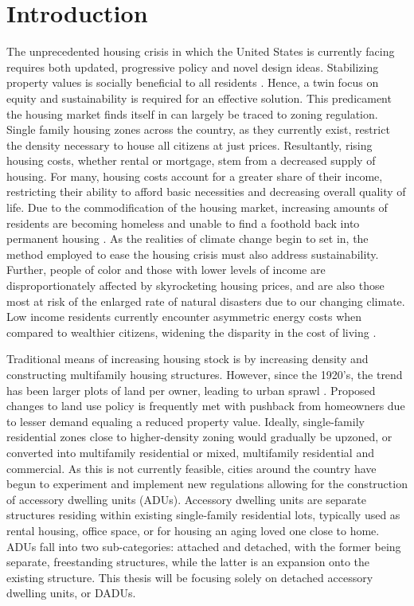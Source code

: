 \chapter {Introduction}

The unprecedented housing crisis in which the United States is currently facing requires both updated, progressive policy and novel design ideas. Stabilizing property values is socially beneficial to all residents \cite{10.2307/24392672}. Hence, a twin focus on equity and sustainability is required for an effective solution. This predicament the housing market finds itself in can largely be traced to zoning regulation. Single family housing zones across the country, as they currently exist, restrict the density necessary to house all citizens at just prices. Resultantly, rising housing costs, whether rental or mortgage, stem from a decreased supply of housing. For many, housing costs account for a greater share of their income, restricting their ability to afford basic necessities and decreasing overall quality of life. Due to the commodification of the housing market, increasing amounts of residents are becoming homeless and unable to find a foothold back into permanent housing \cite{routhierStateHomeless20212021}. As the realities of climate change begin to set in, the method employed to ease the housing crisis must also address sustainability. Further, people of color and those with lower levels of income are disproportionately affected by skyrocketing housing prices, and are also those most at risk of the enlarged rate of natural disasters due to our changing climate. Low income residents currently encounter asymmetric energy costs when compared to wealthier citizens, widening the disparity in the cost of living \cite{kontokostaEnergyCostBurdens2020a}. 

Traditional means of increasing housing stock is by increasing density and constructing multifamily housing structures. However, since the 1920’s, the trend has been larger plots of land per owner, leading to urban sprawl \cite{hertzImmaculateConceptionTheory15}. Proposed changes to land use policy is frequently met with pushback from homeowners due to lesser demand equaling a reduced property value. Ideally, single-family residential zones close to higher-density zoning would gradually be upzoned, or converted into multifamily residential or mixed, multifamily residential and commercial. As this is not currently feasible, cities around the country have begun to experiment and implement new regulations allowing for the construction of accessory dwelling units (ADUs). Accessory dwelling units are separate structures residing within existing single-family residential lots, typically used as rental housing, office space, or for housing an aging loved one close to home. ADUs fall into two sub-categories: attached and detached, with the former being separate, freestanding structures, while the latter is an expansion onto the existing structure. This thesis will be focusing solely on detached accessory dwelling units, or DADUs.

